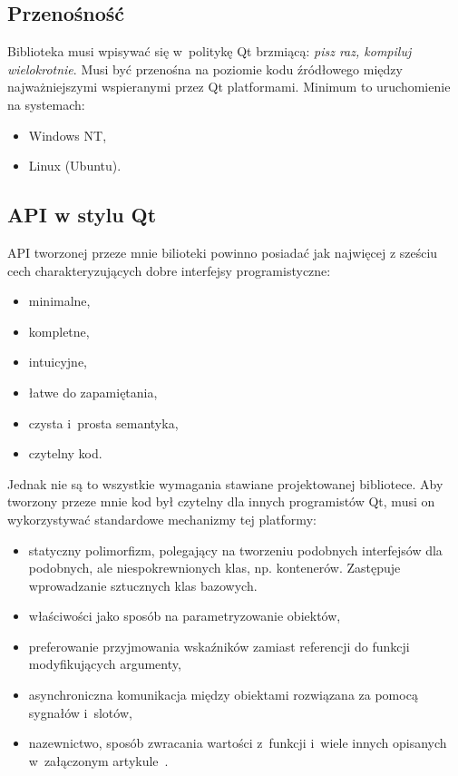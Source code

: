 \documentclass[11pt,twoside,a4paper,final]{article}
\begin{document}
\subsection{Przenośność}
Biblioteka musi wpisywać się w~politykę Qt brzmiącą: \textit{pisz raz, kompiluj wielokrotnie}. Musi być przenośna na poziomie kodu źródłowego między najważniejszymi wspieranymi przez Qt platformami.
Minimum to uruchomienie na systemach:
\begin{itemize}
\item{Windows NT,}
\item{Linux (Ubuntu).}
\end{itemize}


\subsection{API w stylu Qt}
API tworzonej przeze mnie bilioteki powinno posiadać jak najwięcej z sześciu cech charakteryzujących dobre interfejsy programistyczne:
\begin{itemize}
\item{minimalne,}
\item{kompletne,}
\item{intuicyjne,} 
\item{łatwe do zapamiętania,}
\item{czysta i~prosta semantyka,}
\item{czytelny kod.}
\end{itemize}

Jednak nie są to wszystkie wymagania stawiane projektowanej bibliotece. Aby tworzony przeze mnie kod był czytelny dla innych programistów Qt, musi on wykorzystywać standardowe mechanizmy tej platformy:
\begin{itemize}
\item{statyczny polimorfizm, polegający na tworzeniu podobnych interfejsów dla podobnych, ale niespokrewnionych klas, np. kontenerów. Zastępuje wprowadzanie sztucznych klas bazowych.}
\item{właściwości jako sposób na parametryzowanie obiektów,}
\item{preferowanie przyjmowania wskaźników zamiast referencji do funkcji modyfikujących argumenty,}
\item{asynchroniczna komunikacja między obiektami rozwiązana za pomocą sygnałów i~slotów,}
\item{nazewnictwo, sposób zwracania wartości z~funkcji i~wiele innych opisanych w~załączonym artykule~\cite{qt-api}.}
\end{itemize}
\end{document}
